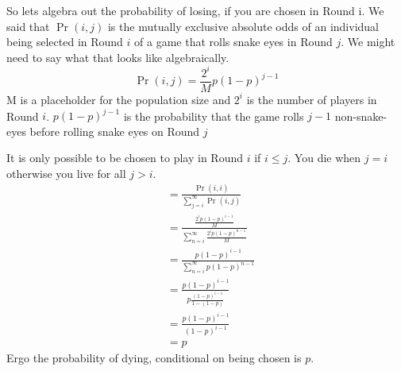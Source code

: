 \documentclass[12pt, letterpaper]{article}
\newcommand{\mycomment}[1]{}
\begin{document}
So lets algebra out the probability of losing, if you are chosen in Round i.
We said that $\Pr(i,j)$ is the mutually exclusive absolute odds of an individual being selected in Round $i$ of a game that rolls snake eyes in Round $j$.  We might need to say what that looks like algebraically. 
\begin{equation}
    \Pr(i,j) = \frac{2^i}{M}p(1-p)^{j-1}
\end{equation}
M is a placeholder for the population size and $2^i$ is the number of players in Round $i$.  $p(1-p)^{j-1}$ is the probability that the game rolls $j-1$ non-snake-eyes before rolling snake eyes on Round $j$

It is only possible to be chosen to play in Round $i$ if $i\leq j$.  You die when $j=i$ otherwise you live for all $j>i$. 
\begin{align*}
 &= \frac{\Pr(i,i)}{\sum_{j=i}^\infty \Pr(i,j)}\\
 &=\frac{\frac{2^{i}p(1-p)^{i-1}}{M}}{\sum_{n=i}^{\infty} \frac{2^{i}p(1-p)^{n-1}}{M}}\\
 &=\frac{p(1-p)^{i-1}}{\sum_{n=i}^{\infty}p(1-p)^{n-1}}\\
 &=\frac{p(1-p)^{i-1}}{p\frac{(1-p)^{i-1}}{1-(1-p)}}\\
 &=\frac{p(1-p)^{i-1}}{(1-p)^{i-1}}\\
 &=p
\end{align*}
Ergo the probability of dying, conditional on being chosen is $p$.
\mycomment{
This should makes sense to us within the narrative that, if you are selected to play in any specific round then the odds of you losing that round is determined by a fair dice roll made for that round and your odds of losing are $p=\frac{1}{36}$. No matter which round you are selected to play in, if you play you will only observe one roll of the dice and, since the dice rolls are independent, the process and your observation are memory-less.
}
\end{document}
